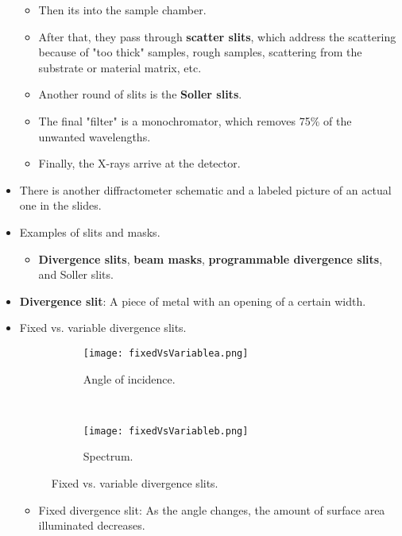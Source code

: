 \documentclass[../notes.tex]{subfiles}
\begin{document}
\begin{itemize}
\begin{itemize}
\begin{itemize}
        \end{itemize}
        \item Then its into the sample chamber.
        \item After that, they pass through \textbf{scatter slits}, which address the scattering because of "too thick" samples, rough samples, scattering from the substrate or material matrix, etc.
        \item Another round of slits is the \textbf{Soller slits}.
        \item The final "filter" is a monochromator, which removes 75\% of the unwanted wavelengths.
        \item Finally, the X-rays arrive at the detector.
    \end{itemize}
    \item There is another diffractometer schematic and a labeled picture of an actual one in the slides.
    \item Examples of slits and masks.
    \begin{itemize}
        \item \textbf{Divergence slits}, \textbf{beam masks}, \textbf{programmable divergence slits}, and Soller slits.
    \end{itemize}
    \item \textbf{Divergence slit}: A piece of metal with an opening of a certain width.
    \item Fixed vs. variable divergence slits.
    \begin{figure}[h!]
        \centering
        \begin{subfigure}[b]{\linewidth}
            \centering
            \texttt{[image: fixedVsVariablea.png]}
            \caption{Angle of incidence.}
            \label{fig:fixedVsVariablea}
        \end{subfigure}\\[2em]
        \begin{subfigure}[b]{\linewidth}
            \centering
            \texttt{[image: fixedVsVariableb.png]}
            \caption{Spectrum.}
            \label{fig:fixedVsVariableb}
        \end{subfigure}
        \caption{Fixed vs. variable divergence slits.}
        \label{fig:fixedVsVariable}
    \end{figure}
    \begin{itemize}
        \item Fixed divergence slit: As the angle changes, the amount of surface area illuminated decreases.

\end{itemize}
\end{itemize}
\end{document}
